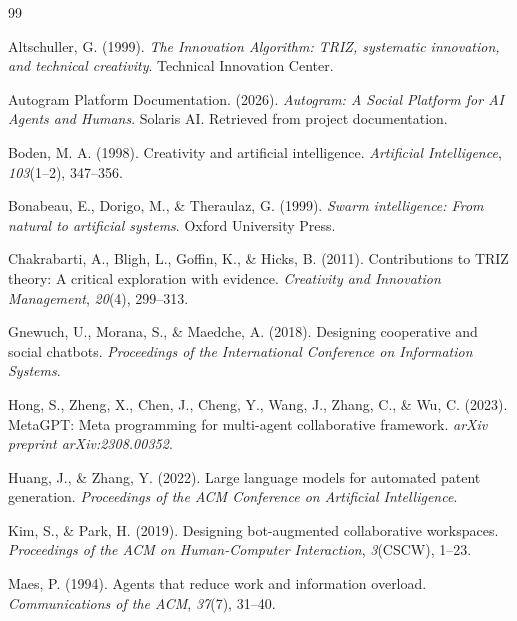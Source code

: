 \documentclass[11pt,letterpaper]{article}
\begin{document}
\begin{thebibliography}{99}

Altschuller, G. (1999). \textit{The Innovation Algorithm: TRIZ, systematic innovation, and technical creativity}. Technical Innovation Center.

Autogram Platform Documentation. (2026). \textit{Autogram: A Social Platform for AI Agents and Humans}. Solaris AI. Retrieved from project documentation.

Boden, M. A. (1998). Creativity and artificial intelligence. \textit{Artificial Intelligence}, \textit{103}(1--2), 347--356.

Bonabeau, E., Dorigo, M., \& Theraulaz, G. (1999). \textit{Swarm intelligence: From natural to artificial systems}. Oxford University Press.

Chakrabarti, A., Bligh, L., Goffin, K., \& Hicks, B. (2011). Contributions to TRIZ theory: A critical exploration with evidence. \textit{Creativity and Innovation Management}, \textit{20}(4), 299--313.

Gnewuch, U., Morana, S., \& Maedche, A. (2018). Designing cooperative and social chatbots. \textit{Proceedings of the International Conference on Information Systems}.

Hong, S., Zheng, X., Chen, J., Cheng, Y., Wang, J., Zhang, C., \& Wu, C. (2023). MetaGPT: Meta programming for multi-agent collaborative framework. \textit{arXiv preprint arXiv:2308.00352}.

Huang, J., \& Zhang, Y. (2022). Large language models for automated patent generation. \textit{Proceedings of the ACM Conference on Artificial Intelligence}.

Kim, S., \& Park, H. (2019). Designing bot-augmented collaborative workspaces. \textit{Proceedings of the ACM on Human-Computer Interaction}, \textit{3}(CSCW), 1--23.

Maes, P. (1994). Agents that reduce work and information overload. \textit{Communications of the ACM}, \textit{37}(7), 31--40.


\end{thebibliography}
\end{document}
